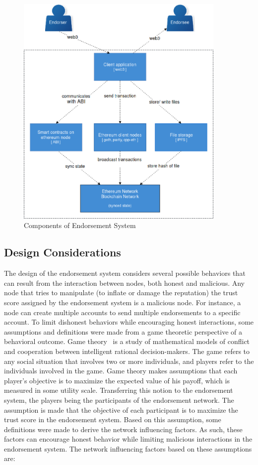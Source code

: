 \begin{figure}
	\includegraphics[width=0.9\textwidth]{Images/components.eps}
	\caption{Components of Endorsement System}
	\label{fig:components}
\end{figure}
\subsection{Design Considerations}
The design of the endorsement system considers several possible behaviors that
can result from the interaction between nodes, both honest and malicious. Any
node that tries to manipulate (to inflate or damage the reputation) the trust
score assigned by the endorsement system is a malicious node. For instance, a
node can create multiple accounts to send multiple endorsements to a specific
account. To limit dishonest behaviors while encouraging honest interactions,
some assumptions and definitions were made from a game theoretic perspective of
a behavioral outcome. Game theory~\cite{myerson2013game} is a study of
mathematical models of conflict and cooperation between intelligent rational
decision-makers. The game refers to any social situation that involves two or
more individuals, and players refer to the individuals involved in the game.
Game theory makes assumptions that each player's objective is to maximize the
expected value of his payoff, which is measured in some utility scale.
Transferring this notion to the endorsement system, the players being the
participants of the endorsement network. The assumption is made that the
objective of each participant is to maximize the trust score in the endorsement
system. Based on this assumption, some definitions were made to derive the
network influencing factors. As such, these factors can encourage honest
behavior while limiting malicious interactions in the endorsement system. 
The network influencing factors based on these assumptions are:
